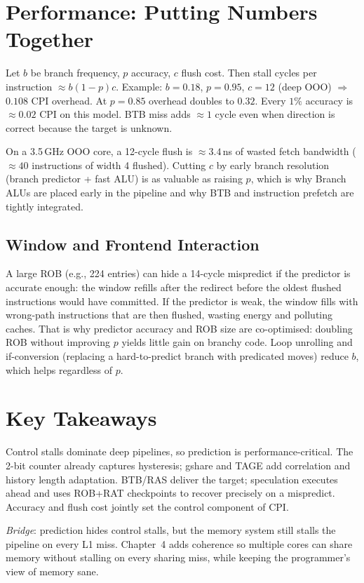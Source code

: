 \section{Performance: Putting Numbers Together}
Let $b$ be branch frequency, $p$ accuracy, $c$ flush cost. Then stall cycles per instruction $\approx b(1-p)c$. Example: $b=0.18$, $p=0.95$, $c=12$ (deep OOO) $\Rightarrow$ $0.108$ CPI overhead. At $p=0.85$ overhead doubles to $0.32$. Every $1\%$ accuracy is $\approx 0.02$ CPI on this model. BTB miss adds $\approx 1$ cycle even when direction is correct because the target is unknown.

On a 3.5\,GHz OOO core, a 12-cycle flush is $\approx 3.4$\,ns of wasted fetch bandwidth ($\approx 40$ instructions of width 4 flushed). Cutting $c$ by early branch resolution (branch predictor + fast ALU) is as valuable as raising $p$, which is why Branch ALUs are placed early in the pipeline and why BTB and instruction prefetch are tightly integrated.

\subsection{Window and Frontend Interaction}
A large ROB (e.g., 224 entries) can hide a 14-cycle mispredict if the predictor is accurate enough: the window refills after the redirect before the oldest flushed instructions would have committed. If the predictor is weak, the window fills with wrong-path instructions that are then flushed, wasting energy and polluting caches. That is why predictor accuracy and ROB size are co-optimised: doubling ROB without improving $p$ yields little gain on branchy code. Loop unrolling and if-conversion (replacing a hard-to-predict branch with predicated moves) reduce $b$, which helps regardless of $p$.

\section{Key Takeaways}
Control stalls dominate deep pipelines, so prediction is performance-critical. The 2-bit counter already captures hysteresis; gshare and TAGE add correlation and history length adaptation. BTB/RAS deliver the target; speculation executes ahead and uses ROB+RAT checkpoints to recover precisely on a mispredict. Accuracy and flush cost jointly set the control component of CPI.

\textit{Bridge}: prediction hides control stalls, but the memory system still stalls the pipeline on every L1 miss. Chapter~4 adds coherence so multiple cores can share memory without stalling on every sharing miss, while keeping the programmer's view of memory sane.


